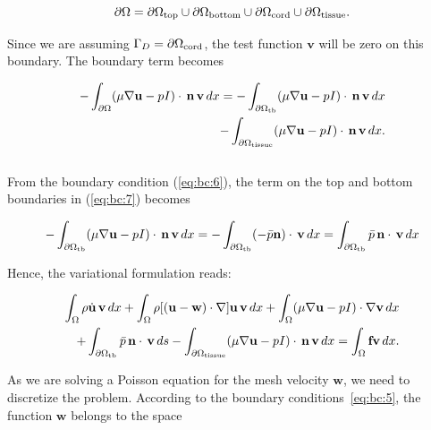 \documentclass[11pt,a4paper,titlepage]{report}
\begin{document}
\begin{equation}
\partial \Omega= \partial \Omega_{\rm top} \cup
\partial \Omega_{\rm bottom} \cup
\partial \Omega_{\rm cord} \cup
\partial \Omega_{\rm tissue}.
\end{equation}

Since we are assuming $\Gamma_D = \partial \Omega_{\rm cord}$, the test function $\mathbf{v}$ will be zero on this boundary. The boundary term becomes

\begin{equation}
\label{eq:bc:7}
\begin{split}
- \int_{\partial \Omega} (\mu \nabla \mathbf{u} - p I) \cdot \, \mathbf{n} \, \mathbf{v} \, dx =
-\int_{\partial \Omega_{\rm tb}} (\mu \nabla \mathbf{u} - p I) \cdot \, \mathbf{n} \, \mathbf{v} \, dx \\
- \int_{\partial \Omega_{\rm tissue}} (\mu \nabla \mathbf{u} - p I) \cdot \, \mathbf{n} \, \mathbf{v} \, dx.
\end{split}
\end{equation}
\\

From the boundary condition (\ref{eq:bc:6}), the term on the top and bottom boundaries in (\ref{eq:bc:7}) becomes

\begin{equation}
- \int_{\partial \Omega_{\rm tb}} (\mu \nabla \mathbf{u} - p I) \cdot \, \mathbf{n} \, \mathbf{v} \, dx = 
- \int_{\partial \Omega_{\rm tb}} (-\bar{p} \mathbf{n}) \cdot \, \mathbf{v} \, dx = 
\int_{\partial \Omega_{\rm tb}} \bar{p} \, \mathbf{n} \cdot \, \mathbf{v} \, dx
\end{equation}

Hence, the variational formulation reads:

\begin{equation}
\label{eq:ns:5}
\begin{split}
\int_{\Omega} \rho \dot{\mathbf{u}} \, \mathbf{v} \, dx
+ \int_{\Omega} \rho [(\mathbf{u - w}) \cdot \nabla] \mathbf{u} \, \mathbf{v} \, dx
+ \int_{\Omega} (\mu \nabla \mathbf{u} - pI) \cdot \nabla \mathbf{v} \, dx \\
+ \int_{\partial \Omega_{\rm tb}} \bar{p} \, \mathbf{n} \cdot \, \mathbf{v} \, ds
- \int_{\partial \Omega_{\rm tissue}} (\mu \nabla \mathbf{u} - p I) \cdot \, \mathbf{n} \, \mathbf{v} \, dx
=  \int_{\Omega} \mathbf{f} \mathbf{v} \, dx.
\end{split}
\end{equation}

As we are solving a Poisson equation for the mesh velocity $\mathbf{w}$, we need to discretize the problem. According to the boundary conditions~\eqref{eq:bc:5}, the function $\mathbf{w}$ belongs to the space
\end{document}
